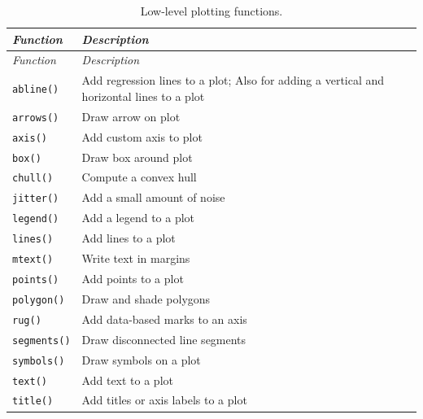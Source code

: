 \documentclass[
]{book}
\begin{document}
\begin{longtable}[]{@{}
  >{\raggedright\arraybackslash}p{}
  >{\raggedright\arraybackslash}p{}@{}}
\caption{\label{tab:lowlevelPlotFuncs} Low-level plotting functions.}\tabularnewline
\toprule\noalign{}
\begin{minipage}[b]{\linewidth}\raggedright
\emph{{Function}}
\end{minipage} & \begin{minipage}[b]{\linewidth}\raggedright
\emph{{Description}}
\end{minipage} \\
\midrule\noalign{}
\endfirsthead
\toprule\noalign{}
\begin{minipage}[b]{\linewidth}\raggedright
\emph{{Function}}
\end{minipage} & \begin{minipage}[b]{\linewidth}\raggedright
\emph{{Description}}
\end{minipage} \\
\midrule\noalign{}
\endhead
\bottomrule\noalign{}
\endlastfoot
\texttt{abline()} & Add regression lines to a plot; Also for adding a vertical and horizontal lines to a plot \\
\texttt{arrows()} & Draw arrow on plot \\
\texttt{axis()} & Add custom axis to plot \\
\texttt{box()} & Draw box around plot \\
\texttt{chull()} & Compute a convex hull \\
\texttt{jitter()} & Add a small amount of noise \\
\texttt{legend()} & Add a legend to a plot \\
\texttt{lines()} & Add lines to a plot \\
\texttt{mtext()} & Write text in margins \\
\texttt{points()} & Add points to a plot \\
\texttt{polygon()} & Draw and shade polygons \\
\texttt{rug()} & Add data-based marks to an axis \\
\texttt{segments()} & Draw disconnected line segments \\
\texttt{symbols()} & Draw symbols on a plot \\
\texttt{text()} & Add text to a plot \\
\texttt{title()} & Add titles or axis labels to a plot \\
\end{longtable}
\end{document}
